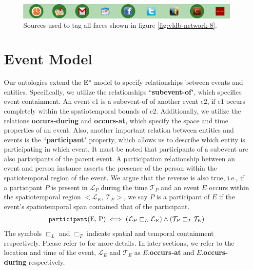 \begin{figure}[h!]
\centering
\includegraphics[width=\textwidth]{media/chapter4/stacktrace/vldb-source-3.png}
\caption{Sources used to tag all faces shown in figure \ref{fig:vldb-network-8}.}
\label{fig:vldb-network-3}
\end{figure}


\section{Event Model}
Our ontologies extend the E* model\cite{gupta2011managing} to specify relationships between events and entities. Specifically, we utilize the relationships ``\textbf{subevent-of}", which specifies event containment. An event $e1$ is a subevent-of of another event $e2$, if $e1$ occurs completely within the spatiotemporal bounds of $e2$. Additionally, we utilize the relations \textbf{occurs-during} and \textbf{occurs-at}, which specify the space and time properties of an event. Also, another important relation between entities and events is the ``\textbf{participant}" property, which allows us to describe which entity is participating in which event. It must be noted that participants of a subevent are also participants of the parent event. A participation relationship between an event and person instance asserts the presence of the person within the spatiotemporal region of the event. We argue that the reverse is also true, i.e., if a participant $P$ is present in $\mathcal{L}_P$ during the time $\mathcal{T}_P$ and an event $E$ occurs within the spatiotemporal region $<\mathcal{L}_E$, $\mathcal{T}_E>$, we say $P$ is a participant of $E$ if the event's spatiotemporal span contained that of the participant.
\begin{equation}
\label{eq:participation-region}
\begin{aligned}
\text{\texttt{participant}(E, P)} \iff (\mathcal{L}_P \sqsubset_L \mathcal{L}_E) \wedge (\mathcal{T}_P \sqsubset_T \mathcal{T}_E)
\end{aligned}
\end{equation}
The symbols $\sqsubset_L$ and $\sqsubset_T$ indicate spatial and temporal containment respectively. Please refer to \cite{gupta2011managing} for more details. In later sections, we refer to the location and time of the event, $\mathcal{L}_E$ and $\mathcal{T}_E$ as $E$.\textbf{occurs-at} and $E.$\textbf{occurs-during} respectively. 


